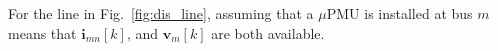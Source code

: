 \documentclass[twocolumn]{IEEEtran}
\newcommand{\mup}{\mu \text{PMU}}
\newcommand{\bs}{\boldsymbol}
\newcommand{\mb}{\mathbf}
\begin{document}
For the line in Fig.~\ref{fig:dis_line}, assuming that a $\mup$ is installed at bus $m$ means that $\mb{i}_{mn}[k]$, and $\mb{v}_m[k]$ are both available. 
\end{document}
